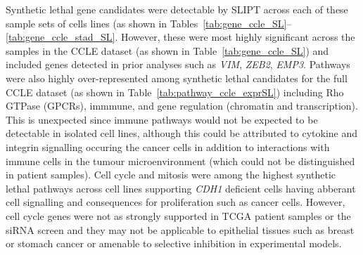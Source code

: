 Synthetic lethal gene candidates were detectable by \gls{SLIPT} across each of these sample sets of cells lines (as shown in Tables~\ref{tab:gene_ccle_SL}\nobreakdash--\ref{tab:gene_ccle_stad_SL}. However, these were most highly significant across the samples in the \gls{CCLE}  dataset (as shown in Table~\ref{tab:gene_ccle_SL}) and included genes detected in prior analyses such as \textit{VIM}, \textit{ZEB2}, \textit{EMP3}. Pathways were also highly over-represented among \gls{synthetic lethal} candidates for the full \gls{CCLE} dataset (as shown in Table~\ref{tab:pathway_ccle_exprSL}) including Rho GTPase (\glspl{GPCR}), immmune, and gene regulation (chromatin and transcription). This is unexpected since immune pathways would not be expected to be detectable in isolated cell lines, although this could be attributed to cytokine and integrin signalling occuring the cancer cells in addition to interactions with immune cells in the tumour microenvironment (which could not be distinguished in patient samples). Cell cycle and mitosis were among the highest \gls{synthetic lethal} pathways across cell lines supporting \textit{CDH1} deficient cells having abberant cell signalling and consequences for proliferation such as cancer cells. However, cell cycle genes were not as strongly supported in \gls{TCGA} patient samples or the \gls{siRNA} screen \citep{Telford2015} and they may not be applicable to epithelial tissues such as breast or stomach cancer or amenable to selective inhibition in experimental models.   

